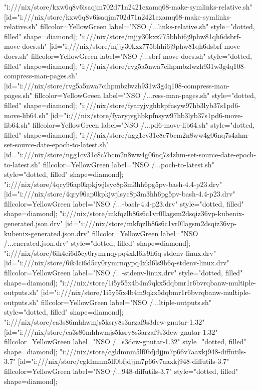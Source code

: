 {"i:///nix/store/kxw6q8v6isaqjm702d71n2421cxamq68-make-symlinks-relative.sh" [id="i:///nix/store/kxw6q8v6isaqjm702d71n2421cxamq68-make-symlinks-relative.sh" fillcolor=YellowGreen label="NSO /...links-relative.sh" style="dotted, filled" shape=diamond];
"i:///nix/store/mjjy30kxz775bhhi6j9phw81qh6dsbrf-move-docs.sh" [id="i:///nix/store/mjjy30kxz775bhhi6j9phw81qh6dsbrf-move-docs.sh" fillcolor=YellowGreen label="NSO /...sbrf-move-docs.sh" style="dotted, filled" shape=diamond];
"i:///nix/store/rvg5a5nwa7cihpmbzlwzh931w3g4q108-compress-man-pages.sh" [id="i:///nix/store/rvg5a5nwa7cihpmbzlwzh931w3g4q108-compress-man-pages.sh" fillcolor=YellowGreen label="NSO /...ress-man-pages.sh" style="dotted, filled" shape=diamond];
"i:///nix/store/fyaryjvghbkpfnsyw97hb3lyb37s1pd6-move-lib64.sh" [id="i:///nix/store/fyaryjvghbkpfnsyw97hb3lyb37s1pd6-move-lib64.sh" fillcolor=YellowGreen label="NSO /...pd6-move-lib64.sh" style="dotted, filled" shape=diamond];
"i:///nix/store/ngg1cv31c8c7bcm2n8ww4g06nq7s4zhm-set-source-date-epoch-to-latest.sh" [id="i:///nix/store/ngg1cv31c8c7bcm2n8ww4g06nq7s4zhm-set-source-date-epoch-to-latest.sh" fillcolor=YellowGreen label="NSO /...poch-to-latest.sh" style="dotted, filled" shape=diamond];
"i:///nix/store/4qry96ap0kpkjwjlsyc8p3m3hh6pg5pv-bash-4.4-p23.drv" [id="i:///nix/store/4qry96ap0kpkjwjlsyc8p3m3hh6pg5pv-bash-4.4-p23.drv" fillcolor=YellowGreen label="NSO /...-bash-4.4-p23.drv" style="dotted, filled" shape=diamond];
"i:///nix/store/mkfqzlb86s6c1vr0llagsm2dsqiz36vp-kubenix-generated.json.drv" [id="i:///nix/store/mkfqzlb86s6c1vr0llagsm2dsqiz36vp-kubenix-generated.json.drv" fillcolor=YellowGreen label="NSO /...enerated.json.drv" style="dotted, filled" shape=diamond];
"i:///nix/store/6ik4ci6d5cy0rymrnqypq4xkl6ls9h6q-stdenv-linux.drv" [id="i:///nix/store/6ik4ci6d5cy0rymrnqypq4xkl6ls9h6q-stdenv-linux.drv" fillcolor=YellowGreen label="NSO /...-stdenv-linux.drv" style="dotted, filled" shape=diamond];
"i:///nix/store/1i5y55x4b4m9qkx5dqbmr1r6bvrqbanw-multiple-outputs.sh" [id="i:///nix/store/1i5y55x4b4m9qkx5dqbmr1r6bvrqbanw-multiple-outputs.sh" fillcolor=YellowGreen label="NSO /...ltiple-outputs.sh" style="dotted, filled" shape=diamond];
"i:///nix/store/ca3s86mhhwmjs5ksry8s3arzaf9s3dcw-gnutar-1.32" [id="i:///nix/store/ca3s86mhhwmjs5ksry8s3arzaf9s3dcw-gnutar-1.32" fillcolor=YellowGreen label="NSO /...s3dcw-gnutar-1.32" style="dotted, filled" shape=diamond];
"i:///nix/store/cgldmnm5lf0bfjdjjm7p66v7aaxkj948-diffutils-3.7" [id="i:///nix/store/cgldmnm5lf0bfjdjjm7p66v7aaxkj948-diffutils-3.7" fillcolor=YellowGreen label="NSO /...948-diffutils-3.7" style="dotted, filled" shape=diamond];
}
